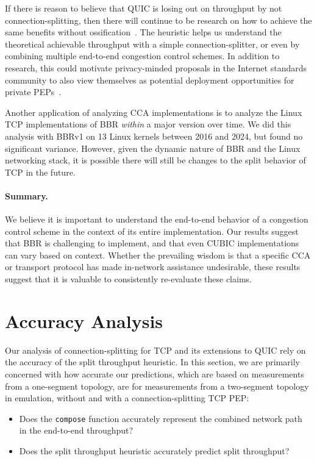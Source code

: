 If there is reason to believe
that QUIC is losing out on throughput by not connection-splitting, then there
will continue to be research on how to achieve the same benefits without
ossification~\cite{kosek2023secure,yuan2024sidekick,kramer2021masquepep,yuan2022sidecar}.
The heuristic helps us understand the theoretical achievable
throughput with a simple connection-splitter, or even by combining multiple
end-to-end congestion control schemes.
In addition to research, this could motivate privacy-minded proposals in the Internet
standards community to also view themselves as potential deployment opportunities
for private PEPs~\cite{kosek2021masque,sattler2022towards,rfc9297,rfc9298}.

Another application of analyzing CCA implementations is to analyze the Linux TCP
implementations of BBR \textit{within} a major version over time. We did
this analysis with BBRv1 on 13 Linux kernels between 2016 and 2024, but found
no significant variance. However, given the dynamic nature of BBR and the
Linux networking stack, it
is possible there will still be changes to the split behavior of TCP in the future.

\paragraph{Summary.}

We believe it is important to understand the end-to-end behavior of a congestion
control scheme in the context of its entire implementation.
Our results suggest that BBR is challenging to implement, and that even CUBIC
implementations can vary based on context. Whether the prevailing wisdom is
that a specific CCA or transport protocol has made in-network assistance
undesirable, these results suggest that it is valuable to consistently
re-evaluate these claims.

\section{Accuracy Analysis}
\label{sec:splitting:accuracy}



Our analysis of connection-splitting for TCP and its extensions to QUIC rely on
the accuracy of the split throughput heuristic. In this section, we are
primarily concerned with how accurate our predictions, which are based on
measurements from a one-segment topology, are for measurements from a
two-segment topology in emulation, without and with a connection-splitting TCP
PEP:
\begin{itemize}[noitemsep]
\item Does the \texttt{compose} function accurately represent the combined
 network path in the end-to-end throughput?
\item Does the split throughput heuristic accurately predict split throughput?
\end{itemize}

